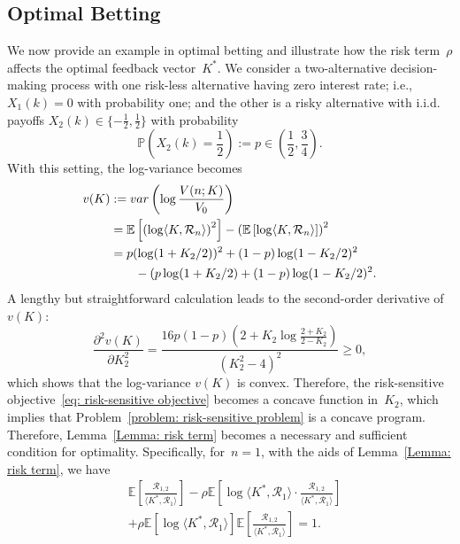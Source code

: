 \documentclass[letterpaper, 10 pt, journal, twoside]{IEEEtran}  %
\begin{document}
\subsection{Optimal Betting}
    We now provide an example in optimal betting and illustrate how the risk term~$\rho$ affects the optimal feedback vector~$K^*$. We consider a two-alternative decision-making process with one risk-less alternative having zero interest rate; i.e., $X_1(k)=0$ with probability one; and the other is a risky alternative with i.i.d. payoffs $X_2(k) \in \{ -\frac{1}{2},\frac{1}{2} \}$ with probability
    $$
    \mathbb{P}\left( X_2(k) = \frac{1}{2} \right) := p \in \left( \frac{1}{2}, \frac{3}{4} \right).
    $$
With this setting, the log-variance becomes
\begin{align*}
    v(K)
    & := {\rm var}\left( \log \frac{V(n; K)}{V_0} \right) \\
    & = \mathbb{E}\left[ \left( \log \langle K, \mathcal{R}_n \rangle  \right)^2 \right]  
        - \left( \mathbb{E} \left[ \log\langle K, \mathcal{R}_n \rangle  \right] \right)^2\\
    & = p (\log (1 + K_2/2))^2  + (1-p) \log (1- K_2/2 )^2  \\
    & \qquad - (p \log (1 + K_2/2) + (1-p)\log (1 - K_2/2)^2.
\end{align*}
A lengthy but straightforward calculation leads to the second-order derivative of $v(K)$:
\[
\frac{\partial^2 v(K)}{ \partial K_2^2 } = \frac{16 p (1-p)  (2 + K_2 \log \frac{2 + K_2 }{2 - K_2} )}{ \left( K_2^2 - 4 \right)^2} \geq 0,
\]
which shows that the log-variance $v(K)$ is convex. Therefore, the risk-sensitive objective~\eqref{eq: risk-sensitive objective} becomes a concave function in~$K_2$, which implies that Problem~\eqref{problem: risk-sensitive problem} is a concave program. Therefore, Lemma~\ref{Lemma: risk term} becomes a necessary and sufficient condition for optimality.    
Specifically, for~$n=1$, with the aids of Lemma~\ref{Lemma: risk term}, we have
\begin{align*}
        & \mathbb{E} \left[ \frac{ \mathcal{R}_{1,2} }{ \langle K^{*}, \mathcal{R}_1 \rangle } \right] - \rho\mathbb{E}\left[ \log \langle K^{*}, \mathcal{R}_1 \rangle \cdot \frac{ \mathcal{R}_{1,2} }{ \langle K^{*}, \mathcal{R}_1 \rangle } \right] \\
        & + \rho \mathbb{E} \left[ \log \langle K^{*}, \mathcal{R}_1 \rangle \right] \mathbb{E}\left[ \frac{\mathcal{R}_{1,2}}{ \langle K^{*}, \mathcal{R}_1 \rangle } \right] = 1.
    \end{align*}
\end{document}
